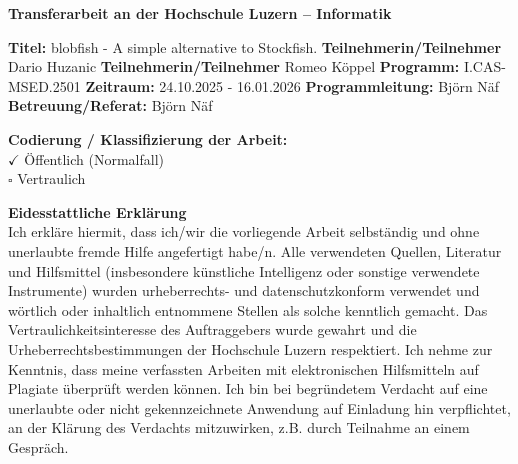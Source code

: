 

\fontsize{12}{14}
\noindent
\textbf{Transferarbeit an der Hochschule Luzern – Informatik} \\ \vspace*{0.6cm}

\fontsize{10.5}{12}
\noindent
\textbf{Titel:} blobfish - A simple alternative to Stockfish.\newline \newline
\textbf{Teilnehmerin/Teilnehmer} Dario Huzanic\newline \newline
\textbf{Teilnehmerin/Teilnehmer} Romeo Köppel\newline \newline
\textbf{Programm:} I.CAS-MSED.2501\newline \newline
\textbf{Zeitraum:} 24.10.2025 - 16.01.2026\newline \newline
\textbf{Programmleitung:} Björn Näf\newline \newline
\textbf{Betreuung/Referat:} Björn Näf

\vspace{1em}

\textbf{Codierung / Klassifizierung der Arbeit:}\\
$\checkmark$ \"Offentlich (Normalfall) \\
$\square$ Vertraulich\\

\vspace{1em}

\textbf{Eidesstattliche Erklärung} \\
Ich erkläre hiermit, dass ich/wir die vorliegende Arbeit selbständig und ohne unerlaubte fremde Hilfe angefertigt habe/n.
Alle verwendeten Quellen, Literatur und Hilfsmittel (insbesondere künstliche Intelligenz oder sonstige verwendete Instrumente) wurden urheberrechts- und datenschutzkonform verwendet und wörtlich oder inhaltlich entnommene Stellen als solche kenntlich gemacht.
Das Vertraulichkeitsinteresse des Auftraggebers wurde gewahrt und die Urheberrechtsbestimmungen der Hochschule Luzern respektiert. \newline \newline
Ich nehme zur Kenntnis, dass meine verfassten Arbeiten mit elektronischen Hilfsmitteln auf Plagiate überprüft werden können. Ich bin bei begründetem Verdacht auf eine unerlaubte oder nicht gekennzeichnete Anwendung auf Einladung hin verpflichtet, an der Klärung des Verdachts mitzuwirken, z.B. durch Teilnahme an einem Gespräch.

